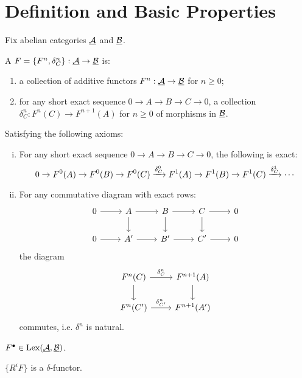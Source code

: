 \section{Definition and Basic Properties}

Fix abelian categories \( \underline{\mathcal{A}} \) and \( \underline{\mathcal{B}} \).

\begin{definition*}
	A  \( F = \{F^n, \delta_{C}^n\}: \underline{\mathcal{A}} \to \underline{\mathcal{B}} \) is:
	\begin{enumerate}
		\item a collection of additive functors \( F^n: \underline{\mathcal{A}} \to \underline{\mathcal{B}} \) for \( n \ge 0 \);
		\item for any short exact sequence \( 0 \to A \to B \to C \to 0 \), a collection \( \delta_C^n: F^n(C) \to F^{n+1}(A) \) for \( n \ge 0 \) of morphisms in \( \underline{\mathcal{B}} \).
	\end{enumerate}
	Satisfying the following axioms:
	\begin{enumerate}[(i)]
		\item For any short exact sequence \( 0 \to A \to B \to C \to 0 \), the following is exact:
			\[
				0 \to F^0(A) \to F^0(B) \to F^0(C) \xrightarrow{\delta_C^0} F^1(A) \to F^1(B) \to F^1(C) \xrightarrow{\delta_C^1} \dotsm
			\]
		\item For any commutative diagram with exact rows:
			\[
				\begin{tikzcd}
					0 \arrow[r] & A \arrow[r] \arrow[d] & B \arrow[r] \arrow[d] & C \arrow[r] \arrow[d] & 0 \\
					0 \arrow[r] & A' \arrow[r] & B' \arrow[r] & C' \arrow[r] & 0
				\end{tikzcd}
			\]
			the diagram
			\[
				\begin{tikzcd}
					F^n(C) \arrow[r,"\delta_C^n"] \arrow[d] & F^{n+1}(A) \arrow[d] \\
					F^n(C') \arrow[r,"\delta_{C'}^n"] & F^{n+1}(A')
				\end{tikzcd}
			\]
			commutes, i.e. \( \delta^n \) is natural.
	\end{enumerate}
\end{definition*}

\begin{remark*}
	\( F^\bullet \in \operatorname{Lex}(\underline{\mathcal{A}}, \underline{\mathcal{B}}) \).
\end{remark*}

\begin{example*}
	\( \{R^iF\} \) is a \( \delta \)-functor.
\end{example*}

